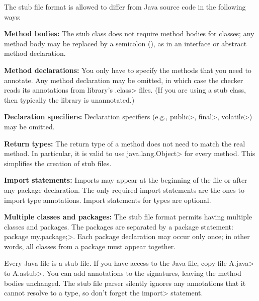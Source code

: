 The stub file format is allowed to differ from Java source code in the
following ways:
\begin{description}

\item{\textbf{Method bodies:}}
  The stub class does not require method bodies for classes; any method
  body may be replaced by a semicolon (\code{;}), as in an interface or
  abstract method declaration.

\item{\textbf{Method declarations:}}
  You only have to specify the methods that you need to annotate.
  Any method declaration may be omitted, in which case the checker reads
  its annotations from library's \<.class> files.  (If you are using a stub class, then
  typically the library is unannotated.)

\item{\textbf{Declaration specifiers:}}
  Declaration specifiers (e.g., \<public>, \<final>, \<volatile>)
  may be omitted.

\item{\textbf{Return types:}}
  The return type of a method does not need to match the real method.
  In particular, it is valid to use \<java.lang.Object> for every method.
  This simplifies the creation of stub files.

\item{\textbf{Import statements:}}
  Imports may appear at the beginning of the file or after any package declaration.
  The only required import statements are the ones to import type
  annotations.  Import statements for types are optional.

\item{\textbf{Multiple classes and packages:}}
  The stub file format permits having multiple classes and packages.
  The packages are separated by a package statement:
  \<package my.package;>.  Each package declaration may occur only once; in
  other words, all classes from a package must appear together.

\end{description}






Every Java file is a stub file.  If you have access to the Java file,
copy file \<A.java> to \<A.astub>.  You can add
annotations to the signatures, leaving the method bodies unchanged.
The stub file parser silently ignores any annotations that it cannot
resolve to a type, so don't forget the \<import> statement.


